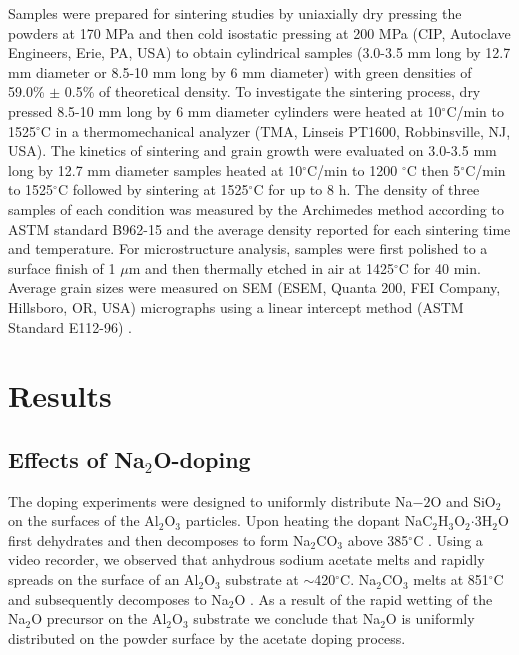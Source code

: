 Samples were prepared for sintering studies by uniaxially dry pressing the powders at 170 MPa and then cold isostatic pressing at 200 MPa (CIP, Autoclave Engineers, Erie, PA, USA) to obtain cylindrical samples (3.0-3.5 mm long by 12.7 mm diameter or 8.5-10 mm long by 6 mm diameter) with green densities of 59.0\% $\pm$ 0.5\% of theoretical density. To investigate the sintering process, dry pressed 8.5-10 mm long by 6 mm diameter cylinders were heated at 10$^{\circ}$C/min to 1525$^{\circ}$C in a thermomechanical analyzer (TMA, Linseis PT1600, Robbinsville, NJ, USA). The kinetics of sintering and grain growth were evaluated on 3.0-3.5 mm long by 12.7 mm diameter samples heated at 10$^{\circ}$C/min to 1200 $^{\circ}$C then 5$^{\circ}$C/min to 1525$^{\circ}$C followed by sintering at 1525$^{\circ}$C for up to 8 h. The density of three samples of each condition was measured by the Archimedes method according to ASTM standard B962-15 \cite{Standard2015} and the average density reported for each sintering time and temperature. For microstructure analysis, samples were first polished to a surface finish of 1 $\mu$m and then thermally etched in air at 1425$^{\circ}$C for 40 min. Average grain sizes were measured on SEM (ESEM, Quanta 200, FEI Company, Hillsboro, OR, USA) micrographs using a linear intercept method (ASTM Standard E112-96) \cite{Standard2013}.

\section{Results}

\subsection{Effects of Na$_{2}$O-doping}

The doping experiments were designed to uniformly distribute Na$-{2}$O and SiO$_{2}$ on the surfaces of the Al$_{2}$O$_{3}$ particles. Upon heating the dopant NaC$_{2}$H$_{3}$O$_{2}$$\cdot$3H$_{2}$O first dehydrates and then decomposes to form Na$_{2}$CO$_{3}$ above 385$^{\circ}$C \cite{Judd1974}. Using a video recorder, we observed that anhydrous sodium acetate melts and rapidly spreads on the surface of an Al$_{2}$O$_{3}$ substrate at $\sim$420$^{\circ}$C. Na$_{2}$CO$_{3}$ melts at 851$^{\circ}$C and subsequently decomposes to Na$_{2}$O \cite{Judd1974}. As a result of the rapid wetting of the Na$_{2}$O precursor on the Al$_{2}$O$_{3}$ substrate we conclude that Na$_{2}$O is uniformly distributed on the powder surface by the acetate doping process. 

